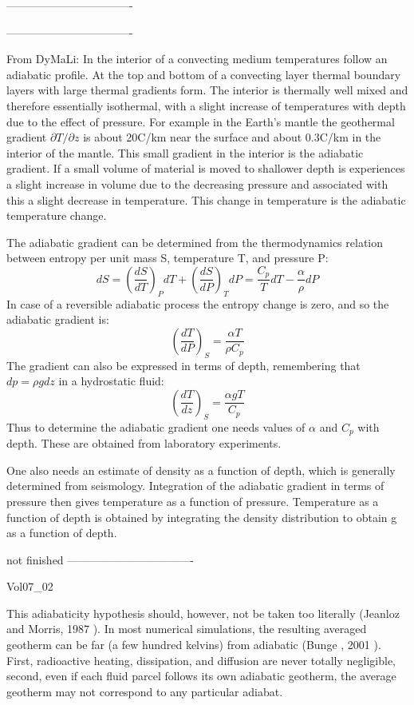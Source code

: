 ----------------------------------


----------------------------------

From DyMaLi: In the interior of a convecting medium temperatures follow an adiabatic profile. 
At the top and bottom of a convecting layer thermal boundary layers with large thermal gradients form. 
The interior is thermally well mixed and therefore essentially isothermal, with a slight increase 
of temperatures with depth due to the effect of pressure.
For example in the Earth’s mantle the geothermal gradient $\partial T /\partial z$ 
is about 20C/km near the 
surface and about 0.3C/km in the interior of the mantle. This small gradient in the 
interior is the adiabatic gradient. If a small
volume of material is moved to shallower depth is experiences a slight increase in volume 
due to the decreasing pressure and associated with this a slight decrease in temperature. 
This change in temperature is the adiabatic temperature change.

The adiabatic gradient can be determined from the thermodynamics relation between entropy per unit mass S,
temperature T, and pressure P:
\[
dS = \left( \frac{dS}{dT}\right)_P dT +  \left( \frac{dS}{dP}\right)_T dP
=
\frac{C_p }{T} dT - \frac{\alpha}{\rho} dP
\]
In case of a reversible adiabatic process the entropy change is zero, and so the adiabatic gradient is:
\[
\left( \frac{dT}{dP}\right)_S = \frac{\alpha T}{\rho C_p} 
\]
The gradient can also be expressed in terms of depth, remembering that $d p = \rho gdz$ 
in a hydrostatic fluid:
\[
\left( \frac{dT}{dz}\right)_S = \frac{\alpha g T}{C_p} 
\]
Thus to determine the adiabatic gradient one needs values of $\alpha$ 
and $C_p$ with depth. These are obtained from laboratory experiments.

One also needs an estimate of density as a function of depth, which is generally determined
from seismology. 
Integration of the adiabatic gradient in terms of pressure then gives
temperature as a function of pressure. 
Temperature as a function of depth is obtained by integrating the density
distribution to obtain g as a function of depth.

not finished
----------------------------------

Vol07\_02

This adiabaticity hypothesis should, however, not
be taken too literally (Jeanloz and Morris, 1987 \cite{jemo87}). In
most numerical simulations, the resulting averaged
geotherm can be far (a few hundred kelvins) from
adiabatic (Bunge \etal, 2001 \cite{burm01}). First, radioactive 
heating, dissipation, and diffusion are never totally
negligible, second, even if each fluid parcel follows
its own adiabatic geotherm, the average geotherm
may not correspond to any particular adiabat.



